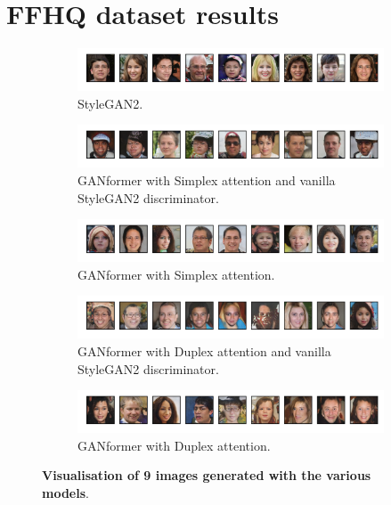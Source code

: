 \documentclass{article}
\begin{document}
\clearpage 
\section{FFHQ dataset results} \label{sec:ffhq-results}
\begin{figure}[htpb]
	\centering
	\begin{subfigure}{\linewidth}
		\includegraphics[width=\linewidth]{ffhq-random_Stylegan2.png}
		\vspace{-7mm}
		\caption{StyleGAN2.} 
	\end{subfigure}
	\begin{subfigure}{\linewidth}
		\includegraphics[width=\linewidth]{ffhq-random_GANFormerSimplexNoAtt.png}
		\vspace{-7mm}
		\caption{GANformer with Simplex attention and vanilla StyleGAN2 discriminator.}
	\end{subfigure}
	\begin{subfigure}{\linewidth}
		\includegraphics[width=\linewidth]{ffhq-random_GANFormerSimplexAtt.png}
		\vspace{-7mm}
		\caption{GANformer with Simplex attention.}
	\end{subfigure}
	\begin{subfigure}{\linewidth}
		\includegraphics[width=\linewidth]{ffhq-random_GANFormerDuplexNoAtt.png}
		\vspace{-7mm}
		\caption{GANformer with Duplex attention and vanilla StyleGAN2 discriminator.}
	\end{subfigure}
	\begin{subfigure}{\linewidth}
		\includegraphics[width=\linewidth]{ffhq-random_GANFormerDuplexAtt.png}
		\vspace{-7mm}
		\caption{GANformer with Duplex attention.}
	\end{subfigure}
	\vspace{3mm}
	\caption{\textbf{Visualisation of 9 images generated with the various models}.}\label{fig:random-ffhq}
\end{figure}
\end{document}
